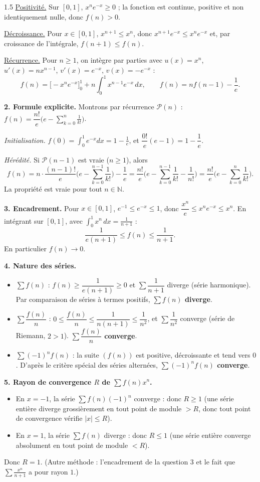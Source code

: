 \documentclass[12pt]{article}
\begin{document}
\begin{spacing}{1.5}
\underline{Positivité.} Sur $[0,1]$, $x^ne^{-x}\ge0$ ; la fonction est continue, positive et non identiquement nulle, donc $f(n)>0$.

\underline{Décroissance.} Pour $x\in[0,1]$, $x^{n+1}\le x^n$, donc $x^{n+1}e^{-x}\le x^ne^{-x}$ et, par croissance de l'intégrale, $f(n+1)\le f(n)$.

\underline{Récurrence.} Pour $n\ge1$, on intègre par parties avec $u(x)=x^n$, $u'(x)=nx^{n-1}$, $v'(x)=e^{-x}$, $v(x)=-e^{-x}$ :
\[
f(n)=\Big[-x^ne^{-x}\Big]_0^1+n\int_0^1x^{n-1}e^{-x}\,dx,\qquad\boxed{f(n)=nf(n-1)-\frac1e}.
\]

\textbf{2. Formule explicite.} Montrons par récurrence $\mathcal{P}(n)$ : $f(n)=\dfrac{n!}{e}\Big(e-\displaystyle\sum_{k=0}^n\frac1{k!}\Big)$.

\emph{Initialisation.} $f(0)=\displaystyle\int_0^1e^{-x}dx=1-\frac1e$, et $\dfrac{0!}{e}(e-1)=1-\dfrac1e$.

\emph{Hérédité.} Si $\mathcal{P}(n-1)$ est vraie ($n\ge1$), alors
\[
f(n)=n\cdot\frac{(n-1)!}{e}\Big(e-\sum_{k=0}^{n-1}\frac1{k!}\Big)-\frac1e=\frac{n!}{e}\Big(e-\sum_{k=0}^{n-1}\frac1{k!}-\frac1{n!}\Big)=\frac{n!}{e}\Big(e-\sum_{k=0}^{n}\frac1{k!}\Big).
\]
La propriété est vraie pour tout $n\in\mathbb{N}$.

\textbf{3. Encadrement.} Pour $x\in[0,1]$, $e^{-1}\le e^{-x}\le1$, donc $\dfrac{x^n}{e}\le x^ne^{-x}\le x^n$. En intégrant sur $[0,1]$, avec $\displaystyle\int_0^1x^n\,dx=\frac1{n+1}$ :
\[
\boxed{\frac{1}{e(n+1)}\le f(n)\le\frac1{n+1}}.
\]
En particulier $f(n)\to0$.

\textbf{4. Nature des séries.}
\begin{itemize}
\item $\sum f(n)$ : $f(n)\ge\dfrac{1}{e(n+1)}\ge0$ et $\sum\dfrac{1}{n+1}$ diverge (série harmonique). Par comparaison de séries à termes positifs, \textbf{$\sum f(n)$ diverge}.
\item $\sum\dfrac{f(n)}{n}$ : $0\le\dfrac{f(n)}{n}\le\dfrac1{n(n+1)}\le\dfrac1{n^2}$, et $\sum\dfrac1{n^2}$ converge (série de Riemann, $2>1$). \textbf{$\sum\dfrac{f(n)}{n}$ converge}.
\item $\sum(-1)^nf(n)$ : la suite $(f(n))$ est positive, décroissante et tend vers $0$. D'après le critère spécial des séries alternées, \textbf{$\sum(-1)^nf(n)$ converge}.
\end{itemize}

\textbf{5. Rayon de convergence $R$ de $\sum f(n)x^n$.}

\begin{itemize}
\item En $x=-1$, la série $\sum f(n)(-1)^n$ converge : donc $R\ge1$ (une série entière diverge grossièrement en tout point de module $>R$, donc tout point de convergence vérifie $|x|\le R$).
\item En $x=1$, la série $\sum f(n)$ diverge : donc $R\le1$ (une série entière converge absolument en tout point de module $<R$).
\end{itemize}
Donc $\boxed{R=1}$. (Autre méthode : l'encadrement de la question 3 et le fait que $\sum\frac{x^n}{n+1}$ a pour rayon $1$.)

\end{spacing}
\end{document}
